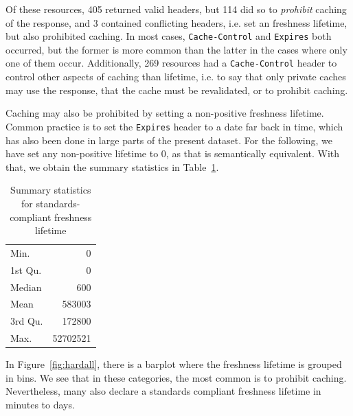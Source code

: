 \documentclass{llncs}
\newcommand{\httph}[1]{\texttt{#1}}
\begin{document}
Of these resources, 405 returned valid headers, but 114 did so to
\emph{prohibit} caching of the response, and 3 contained conflicting
headers, i.e. set an freshness lifetime, but also prohibited
caching. In most cases, \httph{Cache-Control} and \httph{Expires} both
occurred, but the former is more common than the latter in the cases
where only one of them occur.  Additionally, 269 resources had a
\httph{Cache-Control} header to control other aspects of caching than
lifetime, i.e. to say that only private caches may use the response,
that the cache must be revalidated, or to prohibit caching.

Caching may also be prohibited by setting a non-positive freshness
lifetime. Common practice is to set the \httph{Expires} header to a
date far back in time, which has also been done in large parts of the
present dataset. For the following, we have set any non-positive
lifetime to 0, as that is semantically equivalent. With that, we
obtain the summary statistics in Table~\ref{tab:summaryhard}. 

\begin{table}[ht]
\begin{center}
\caption{Summary statistics for standards-compliant freshness lifetime}\label{tab:summaryhard}
\begin{tabular}{lr}
Min.   &       0   \\ 
1st Qu.&       0   \\ 
Median &     600   \\ 
Mean   &  583003   \\ 
3rd Qu.&  172800   \\ 
Max.   & 52702521   \\ 
   \hline
\end{tabular}
\end{center}
\end{table}

In Figure~\ref{fig:hardall}, there is a barplot where
the freshness lifetime is grouped in bins. We see that in these
categories, the most common is to prohibit caching. Nevertheless, many
also declare a standards compliant freshness lifetime in minutes to
days.
\end{document}

